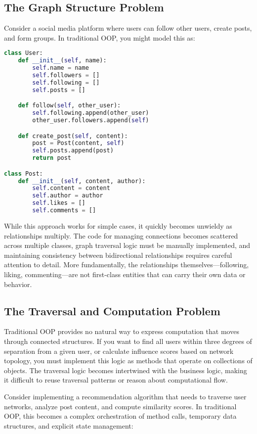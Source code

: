 \subsection{The Graph Structure Problem}

Consider a social media platform where users can follow other users, create posts, and form groups. In traditional OOP, you might model this as:

\begin{lstlisting}[language=Python]
class User:
    def __init__(self, name):
        self.name = name
        self.followers = []
        self.following = []
        self.posts = []

    def follow(self, other_user):
        self.following.append(other_user)
        other_user.followers.append(self)

    def create_post(self, content):
        post = Post(content, self)
        self.posts.append(post)
        return post

class Post:
    def __init__(self, content, author):
        self.content = content
        self.author = author
        self.likes = []
        self.comments = []
\end{lstlisting}

While this approach works for simple cases, it quickly becomes unwieldy as relationships multiply. The code for managing connections becomes scattered across multiple classes, graph traversal logic must be manually implemented, and maintaining consistency between bidirectional relationships requires careful attention to detail. More fundamentally, the relationships themselves—following, liking, commenting—are not first-class entities that can carry their own data or behavior.

\subsection{The Traversal and Computation Problem}

Traditional OOP provides no natural way to express computation that moves through connected structures. If you want to find all users within three degrees of separation from a given user, or calculate influence scores based on network topology, you must implement this logic as methods that operate on collections of objects. The traversal logic becomes intertwined with the business logic, making it difficult to reuse traversal patterns or reason about computational flow.

Consider implementing a recommendation algorithm that needs to traverse user networks, analyze post content, and compute similarity scores. In traditional OOP, this becomes a complex orchestration of method calls, temporary data structures, and explicit state management:


